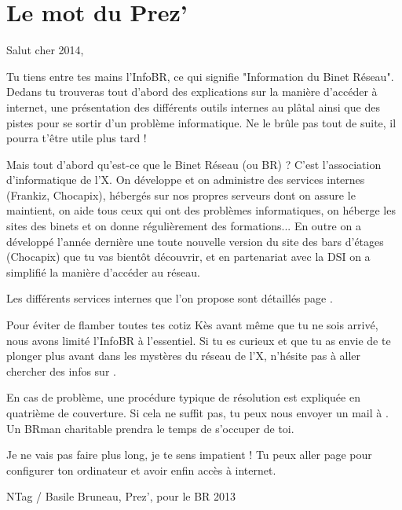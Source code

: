 \thispagestyle{empty}

\section*{Le mot du Prez'}

\vspace{1em}

Salut cher 2014,
\vspace{0.5em}

Tu tiens entre tes mains l'InfoBR, ce qui signifie "Information du Binet Réseau". Dedans tu trouveras tout d'abord des explications sur la manière d'accéder à internet, une présentation des différents outils internes au plâtal ainsi que des pistes pour se sortir d'un problème informatique. Ne le brûle pas tout de suite, il pourra t'être utile plus tard !

Mais tout d'abord qu'est-ce que le Binet Réseau (ou BR) ? C'est l'association d'informatique de l'X. On développe et on administre des services internes (Frankiz, Chocapix), hébergés sur nos propres serveurs dont on assure le maintient, on aide tous ceux qui ont des problèmes informatiques, on héberge les sites des binets et on donne régulièrement des formations... En outre on a développé l'année dernière une toute nouvelle version du site des bars d'étages (Chocapix) que tu vas bientôt découvrir, et en partenariat avec la DSI on a simplifié la manière d'accéder au réseau.

Les différents services internes que l'on propose sont détaillés page \pageref{services}.

Pour éviter de flamber toutes tes cotiz Kès avant même que tu ne sois arrivé, nous avons limité l'InfoBR à l'essentiel. Si tu es curieux et que tu as envie de te plonger plus avant dans les mystères du réseau de l'X, n'hésite pas à aller chercher des infos sur .

\vspace{1em}
En cas de problème, une procédure typique de résolution est expliquée en quatrième de couverture. Si cela ne suffit pas, tu peux nous envoyer un mail à . Un BRman charitable prendra le temps de s'occuper de toi.

Je ne vais pas faire plus long, je te sens impatient ! Tu peux aller page \pageref{config} pour configurer ton ordinateur et avoir enfin accès à internet.

\vspace{2.5em}
\hfill NTag / Basile Bruneau, Prez', pour le BR 2013


\vfill


